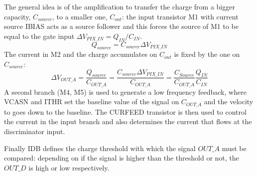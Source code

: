             The general idea is of the amplification to transfer the charge from a bigger capacity\cite{ALPIDE-FE}, $C_{source}$, to a smaller one, $C_{out}$: the input transistor M1 with current source IBIAS acts as a source follower and this forces the source of M1 to be equal to the gate input  $\Delta V_{PIX\_IN} = Q_{IN}/C_{IN}$.
            \begin{equation}
                Q_{source} = C_{source} \Delta V_{PIX\_IN}
            \end{equation}
            The current in M2 and the charge accumulates on $C_{out}$ is fixed by the one on $C_{source}$:
            \begin{equation}
                \Delta V_{OUT\_A} = \frac{Q_{source}}{C_{OUT\_A}} = \frac{C_{source}\Delta V_{PIX\_IN}}{C_{OUT\_A}}  = \frac{C_{Source}}{C_{OUT\_A}}\frac{Q_{IN}}{C_{IN}}
            \end{equation}
            A second branch (M4, M5) is used to generate a low frequency feedback, where VCASN and ITHR set the baseline value of the signal on $C_{OUT\_A}$ and the velocity to goes down to the baseline.
            The CURFEED transistor is then used to control the current in the input branch and also determines the current that flows at the discriminator input. 

            Finally IDB defines the charge threshold with which the signal $OUT\_A$ must be compared: depending on if the signal is higher than the threshold or not, the $OUT\_D$ is high or low respectively.

